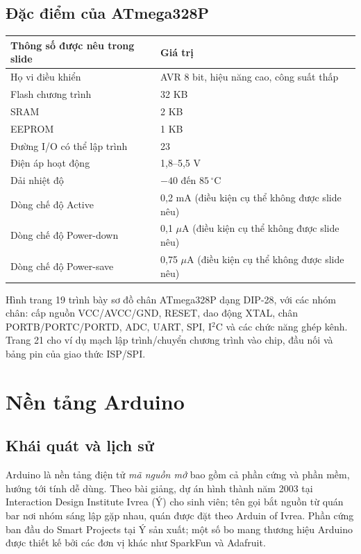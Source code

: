 \subsection{Đặc điểm của ATmega328P}
\begin{longtable}{p{.46\linewidth}p{.45\linewidth}}\toprule\textbf{Thông số được nêu trong slide} & \textbf{Giá trị}\\\midrule\endhead
Họ vi điều khiển & AVR 8 bit, hiệu năng cao, công suất thấp\\
Flash chương trình & 32 KB\\
SRAM & 2 KB\\
EEPROM & 1 KB\\
Đường I/O có thể lập trình & 23\\
Điện áp hoạt động & 1,8--5,5 V\\
Dải nhiệt độ & $-40$ đến $85\,^{\circ}\mathrm C$\\
Dòng chế độ Active & 0,2 mA (điều kiện cụ thể không được slide nêu)\\
Dòng chế độ Power-down & 0,1 $\mu$A (điều kiện cụ thể không được slide nêu)\\
Dòng chế độ Power-save & 0,75 $\mu$A (điều kiện cụ thể không được slide nêu)\\\bottomrule\end{longtable}
Hình trang 19 trình bày sơ đồ chân ATmega328P dạng DIP-28, với các nhóm chân: cấp nguồn VCC/AVCC/GND, RESET, dao động XTAL, chân PORTB/PORTC/PORTD, ADC, UART, SPI, I\(^{2}\)C và các chức năng ghép kênh. Trang 21 cho ví dụ mạch lập trình/chuyển chương trình vào chip, đầu nối và bảng pin của giao thức ISP/SPI.
\section{Nền tảng Arduino}
\subsection{Khái quát và lịch sử}
Arduino là nền tảng điện tử \emph{mã nguồn mở} bao gồm cả phần cứng và phần mềm, hướng tới tính dễ dùng. Theo bài giảng, dự án hình thành năm 2003 tại Interaction Design Institute Ivrea (Ý) cho sinh viên; tên gọi bắt nguồn từ quán bar nơi nhóm sáng lập gặp nhau, quán được đặt theo Arduin of Ivrea. Phần cứng ban đầu do Smart Projects tại Ý sản xuất; một số bo mang thương hiệu Arduino được thiết kế bởi các đơn vị khác như SparkFun và Adafruit.

